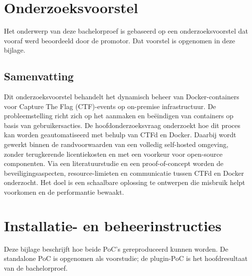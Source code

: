 \documentclass[dutch,dit,thesis]{hogentreport}
\begin{document}








\appendix

\chapter{Onderzoeksvoorstel}

Het onderwerp van deze bachelorproef is gebaseerd op een onderzoeksvoorstel dat vooraf werd beoordeeld door de promotor. Dat voorstel is opgenomen in deze bijlage.

\section*{Samenvatting}

Dit onderzoeksvoorstel behandelt het dynamisch beheer van Docker-containers voor Capture The Flag (CTF)-events op on-premise infrastructuur. De probleemstelling richt zich op het aanmaken en beëindigen van containers op basis van gebruikersacties. De hoofdonderzoeksvraag onderzoekt hoe dit proces kan worden geautomatiseerd met behulp van CTFd en Docker. Daarbij wordt gewerkt binnen de randvoorwaarden van een volledig self-hosted omgeving, zonder terugkerende licentiekosten en met een voorkeur voor open-source componenten. Via een literatuurstudie en een proof-of-concept worden de beveiligingsaspecten, resource-limieten en communicatie tussen CTFd en Docker onderzocht. Het doel is een schaalbare oplossing te ontwerpen die misbruik helpt voorkomen en de performantie bewaakt.




\chapter{Installatie- en beheerinstructies}
\label{app:installatie}

Deze bijlage beschrijft hoe beide PoC's gereproduceerd kunnen worden. De standalone PoC is opgenomen als voorstudie; de plugin-PoC is het hoofdresultaat van de bachelorproef.
\end{document}

